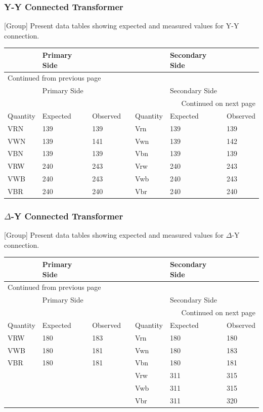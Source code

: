 \documentclass[11pt]{article}
\begin{document}
\subsubsection{Y-Y Connected Transformer}
\label{sec:orgbed635a}
{[}Group] Present data tables showing expected and measured values for Y-Y connection.
\begin{longtable}{|l|l|l|l|l|l|l|}
\hline
 & Primary Side &  &  &  & Secondary Side & \\
\hline
\endfirsthead
\multicolumn{7}{l}{Continued from previous page} \\
\hline

 & Primary Side &  &  &  & Secondary Side &  \\

\hline
\endhead
\hline\multicolumn{7}{r}{Continued on next page} \\
\endfoot
\endlastfoot
\hline
Quantity & Expected & Observed &  & Quantity & Expected & Observed\\
\hline
VRN & 139 & 139 &  & Vrn & 139 & 139\\
\hline
VWN & 139 & 141 &  & Vwn & 139 & 142\\
\hline
VBN & 139 & 139 &  & Vbn & 139 & 139\\
\hline
VRW & 240 & 243 &  & Vrw & 240 & 243\\
\hline
VWB & 240 & 243 &  & Vwb & 240 & 243\\
\hline
VBR & 240 & 240 &  & Vbr & 240 & 240\\
\hline
\end{longtable}
\subsubsection{\(\Delta\)-Y Connected Transformer}
\label{sec:org5cd7750}
{[}Group] Present data tables showing expected and measured values for \(\Delta\)-Y connection.
\begin{longtable}{|l|l|l|l|l|l|l|}
\hline
 & Primary Side &  &  &  & Secondary Side & \\
\hline
\endfirsthead
\multicolumn{7}{l}{Continued from previous page} \\
\hline

 & Primary Side &  &  &  & Secondary Side &  \\

\hline
\endhead
\hline\multicolumn{7}{r}{Continued on next page} \\
\endfoot
\endlastfoot
\hline
Quantity & Expected & Observed &  & Quantity & Expected & Observed\\
\hline
VRW & 180 & 183 &  & Vrn & 180 & 180\\
\hline
VWB & 180 & 181 &  & Vwn & 180 & 183\\
\hline
VBR & 180 & 181 &  & Vbn & 180 & 181\\
\hline
 &  &  &  & Vrw & 311 & 315\\
\hline
 &  &  &  & Vwb & 311 & 315\\
\hline
 &  &  &  & Vbr & 311 & 320\\
\hline
\end{longtable}
\end{document}
